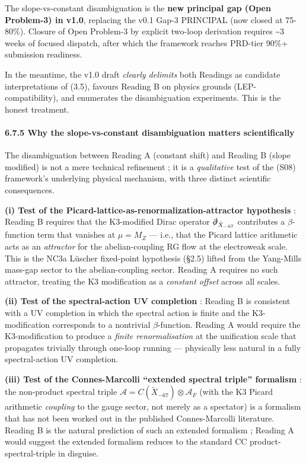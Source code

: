 \documentclass[
  11pt,
  a4paper,
]{article}
\begin{document}
The slope-vs-constant disambiguation is the \textbf{new principal gap (Open Problem-3) in v1.0}, replacing the v0.1 Gap-3 PRINCIPAL (now closed at 75-80\%). Closure of Open Problem-3 by explicit two-loop derivation requires \textasciitilde3 weeks of focused dispatch, after which the framework reaches PRD-tier 90\%+ submission readiness.

In the meantime, the v1.0 draft \emph{clearly delimits} both Readings as candidate interpretations of (3.5), favours Reading B on physics grounds (LEP-compatibility), and enumerates the disambiguation experiments. This is the honest treatment.

\hypertarget{why-the-slope-vs-constant-disambiguation-matters-scientifically}{%
\paragraph{6.7.5 Why the slope-vs-constant disambiguation matters scientifically}\label{why-the-slope-vs-constant-disambiguation-matters-scientifically}}

The disambiguation between Reading A (constant shift) and Reading B (slope modified) is not a mere technical refinement ; it is a \emph{qualitative} test of the (S08) framework's underlying physical mechanism, with three distinct scientific consequences.

\textbf{(i) Test of the Picard-lattice-as-renormalization-attractor hypothesis} : Reading B requires that the K3-modified Dirac operator \(\slashed\partial_{\tilde X_{-67}}\) contributes a \(\beta\)-function term that vanishes at \(\mu = M_Z\) --- i.e., that the Picard lattice arithmetic acts as an \emph{attractor} for the abelian-coupling RG flow at the electroweak scale. This is the NC3a Lüscher fixed-point hypothesis (§2.5) lifted from the Yang-Mills mass-gap sector to the abelian-coupling sector. Reading A requires no such attractor, treating the K3 modification as a \emph{constant offset} across all scales.

\textbf{(ii) Test of the spectral-action UV completion} : Reading B is consistent with a UV completion in which the spectral action is finite and the K3-modification corresponds to a nontrivial \(\beta\)-function. Reading A would require the K3-modification to produce a \emph{finite renormalisation} at the unification scale that propagates trivially through one-loop running --- physically less natural in a fully spectral-action UV completion.

\textbf{(iii) Test of the Connes-Marcolli ``extended spectral triple'' formalism} : the non-product spectral triple \(\mathcal A = C(\tilde X_{-67}) \otimes \mathcal A_F\) (with the K3 Picard arithmetic \emph{coupling} to the gauge sector, not merely as a spectator) is a formalism that has not been worked out in the published Connes-Marcolli literature. Reading B is the natural prediction of such an extended formalism ; Reading A would suggest the extended formalism reduces to the standard CC product-spectral-triple in disguise.
\end{document}

